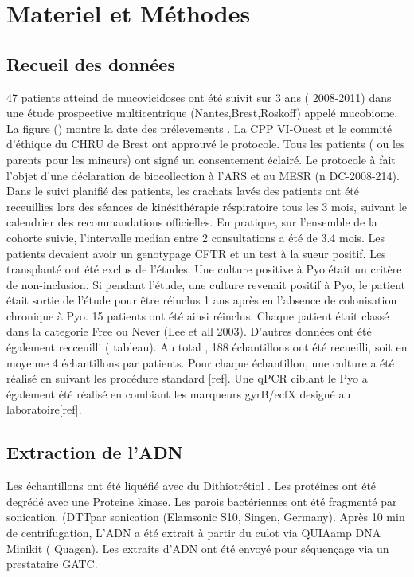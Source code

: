 \documentclass[12pt,a4paper]{article}
\begin{document}
\section{Materiel et Méthodes}
\subsection{Recueil des données}

47 patients atteind de mucovicidoses ont été suivit sur 3 ans ( 2008-2011) dans une étude prospective multicentrique (Nantes,Brest,Roskoff) appelé mucobiome.
La figure () montre la date des prélevements .
La CPP VI-Ouest et le commité d’éthique du CHRU de Brest ont approuvé le protocole. Tous les patients ( ou les parents pour les mineurs) ont signé un consentement éclairé. Le protocole à fait l’objet d’une déclaration de biocollection à l’ARS et au MESR (n DC-2008-214).
Dans le suivi planifié des patients, les crachats lavés des patients ont été receuillies lors des séances de kinésithérapie réspiratoire tous les 3 mois, suivant le calendrier des recommandations officielles. En pratique, sur l’ensemble de la cohorte suivie, l’intervalle median entre 2 consultations a été de 3.4 mois.
Les patients devaient avoir un genotypage CFTR et un test à la sueur positif. Les transplanté ont été exclus de l’études.
Une culture positive à Pyo était un critère de non-inclusion. Si pendant l’étude, une culture revenait positif à Pyo, le patient était sortie de l’étude pour être réinclus 1 ans après en l’absence de colonisation chronique à Pyo. 15 patients ont été ainsi réinclus.
Chaque patient était classé dans la categorie Free ou Never (Lee et all 2003). D’autres données ont été également recceuilli ( tableau).
Au total , 188 échantillons ont été recueilli, soit en moyenne 4 échantillons par patients.
Pour chaque échantillon, une culture a été réalisé en suivant les procédure standard [ref]. Une qPCR ciblant le Pyo a également été réalisé en combiant les marqueurs gyrB/ecfX designé au laboratoire[ref].

\subsection{Extraction de l’ADN}

Les échantillons ont été liquéfié avec du Dithiotrétiol . Les protéines ont été degrédé avec une Proteine kinase.
Les parois bactériennes ont été fragmenté par sonication. (DTTpar sonication (Elamsonic S10, Singen, Germany). Après 10 min de centrifugation, L’ADN a été extrait à partir du culot via QUIAamp DNA Minikit ( Quagen).
Les extraits d’ADN ont été envoyé pour séquençage via un prestataire GATC.
\end{document}
